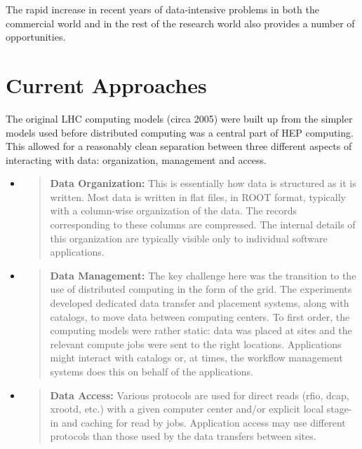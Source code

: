 \documentclass[12pt,a4paper]{article}
\begin{document}
The rapid increase in recent years of data-intensive problems in both
the commercial world and in the rest of the research world also provides
a number of opportunities.

\section{Current Approaches}\label{current-approaches}

The original LHC computing models (circa 2005) were built up from the
simpler models used before distributed computing was a central part of
HEP computing. This allowed for a reasonably clean separation between
three different aspects of interacting with data: organization,
management and access.

\begin{itemize}
\item
  \begin{quote}
  \textbf{Data Organization:} This is essentially how data is structured
  as it is written. Most data is written in flat files, in ROOT format,
  typically with a column-wise organization of the data. The records
  corresponding to these columns are compressed. The internal details of
  this organization are typically visible only to individual software
  applications.
  \end{quote}
\item
  \begin{quote}
  \textbf{Data Management:} The key challenge here was the transition to
  the use of distributed computing in the form of the grid. The
  experiments developed dedicated data transfer and placement systems,
  along with catalogs, to move data between computing centers. To first
  order, the computing models were rather static: data was placed at
  sites and the relevant compute jobs were sent to the right locations.
  Applications might interact with catalogs or, at times, the workflow
  management systems does this on behalf of the applications.
  \end{quote}
\item
  \begin{quote}
  \textbf{Data Access:} Various protocols are used for direct reads
  (rfio, dcap, xrootd, etc.) with a given computer center and/or
  explicit local stage-in and caching for read by jobs. Application
  access may use different protocols than those used by the data
  transfers between sites.
  \end{quote}
\end{itemize}
\end{document}
